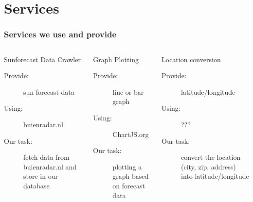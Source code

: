 \documentclass{beamer}
\begin{document}
\section{Services}
\frame
{
\frametitle{Services we use and provide}\begin{columns}[c]  
    \begin{block}{Sunforecast Data Crawler}
	\begin{description}
	  \item[Provide:] sun forecast data
	  \item[Using:] buienradar.nl
	  \item[Our task:] fetch data from buienradar.nl and store in our database
	 \end{description}
     \end{block}
     \begin{block}{Graph Plotting}
	\begin{description} 
	  \item[Provide:] line or bar graph
	  \item[Using:] ChartJS.org
	  \item[Our task:] plotting a graph based on forecast data
	\end{description}
     \end{block}
   \begin{block}{Location conversion}
     \begin{description}  
	\item[Provide:] latitude/longitude
	\item[Using:] ???
	\item[Our task:] convert the location (city, zip, address) into latitude/longitude
     \end{description}
   \end{block}
 \end{columns}
}

 
 
      
\end{document}
